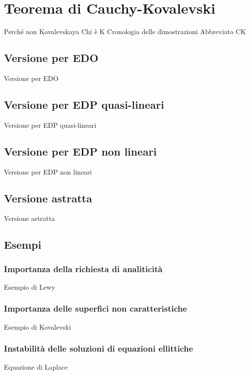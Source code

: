 \chapter{Teorema di Cauchy-Kovalevski}
Perché non Kovalevskaya
Chi è K
Cronologia delle dimostrazioni
Abbreviato CK
\section{Versione per EDO}
Versione per EDO
\section{Versione per EDP quasi-lineari}
Versione per EDP quasi-lineari
\section{Versione per EDP non lineari}
Versione per EDP non lineari
\section{Versione astratta}
Versione astratta
\section{Esempi}
\subsection{Importanza della richiesta di analiticità}
Esempio di Lewy
\subsection{Importanza delle superfici non caratteristiche}
Esempio di Kovalevski
\subsection{Instabilità delle soluzioni di equazioni ellittiche}
Equazione di Laplace
